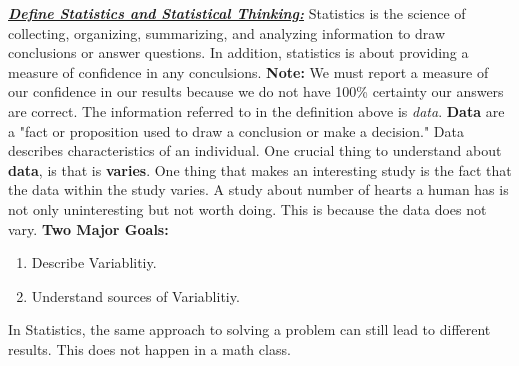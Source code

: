 \documentclass{report}
\begin{document}
    \bigbreak \noindent \bigbreak \noindent 
    \textbf{\textit{\underline{Define Statistics and Statistical Thinking:}}}
    \bigbreak \noindent
        Statistics is the science of collecting, organizing, summarizing, and analyzing information to draw conclusions or answer questions. In addition, statistics is about providing a measure of confidence in any conculsions.
        \bigbreak \noindent 
        \textbf{Note:} We must report a measure of our confidence in our results because we do not have 100\% certainty our answers are correct.
        \bigbreak \noindent 
        The information referred to in the definition above is \textit{data}. \textbf{Data} are a "fact or proposition used to draw a conclusion or make a decision." Data describes characteristics of an individual.
        \bigbreak \noindent 
        One crucial thing to understand about \textbf{data}, is that is \textbf{varies}. One thing that makes an interesting study is the fact that the data within the study varies. A study about number of hearts a human has is not only uninteresting but not worth doing. This is because the data does not vary.
        \bigbreak \noindent 
        \textbf{Two Major Goals:}
        \begin{enumerate}
            \item Describe Variablitiy.
            \item Understand sources of Variablitiy.
        \end{enumerate}
        \bigbreak \noindent 
        In Statistics, the same approach to solving a problem can still lead to different results. This does not happen in a math class.
        \vspace{1em}
\end{document}

